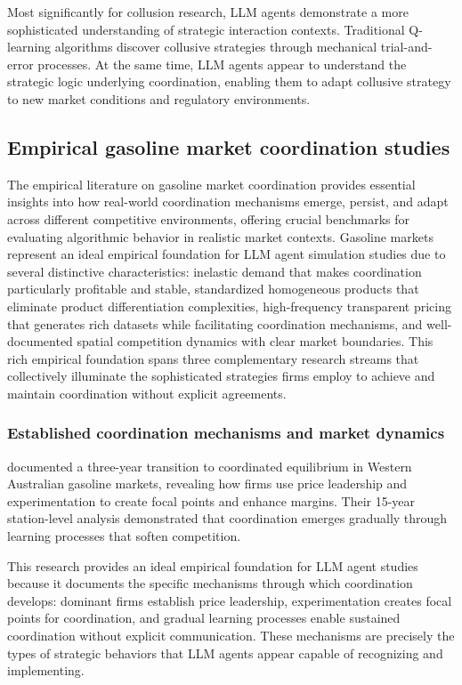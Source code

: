 Most significantly for collusion research, LLM agents demonstrate a more sophisticated understanding of strategic interaction contexts. Traditional Q-learning algorithms discover collusive strategies through mechanical trial-and-error processes. At the same time, LLM agents appear to understand the strategic logic underlying coordination, enabling them to adapt collusive strategy to new market conditions and regulatory environments.

\subsection{Empirical gasoline market coordination studies}

The empirical literature on gasoline market coordination provides essential insights into how real-world coordination mechanisms emerge, persist, and adapt across different competitive environments, offering crucial benchmarks for evaluating algorithmic behavior in realistic market contexts. Gasoline markets represent an ideal empirical foundation for LLM agent simulation studies due to several distinctive characteristics: inelastic demand that makes coordination particularly profitable and stable, standardized homogeneous products that eliminate product differentiation complexities, high-frequency transparent pricing that generates rich datasets while facilitating coordination mechanisms, and well-documented spatial competition dynamics with clear market boundaries. This rich empirical foundation spans three complementary research streams that collectively illuminate the sophisticated strategies firms employ to achieve and maintain coordination without explicit agreements.

\subsubsection*{Established coordination mechanisms and market dynamics}

\textcite{byrne_learning_2019} documented a three-year transition to coordinated equilibrium in Western Australian gasoline markets, revealing how firms use price leadership and experimentation to create focal points and enhance margins. Their 15-year station-level analysis demonstrated that coordination emerges gradually through learning processes that soften competition.

This research provides an ideal empirical foundation for LLM agent studies because it documents the specific mechanisms through which coordination develops: dominant firms establish price leadership, experimentation creates focal points for coordination, and gradual learning processes enable sustained coordination without explicit communication. These mechanisms are precisely the types of strategic behaviors that LLM agents appear capable of recognizing and implementing.

